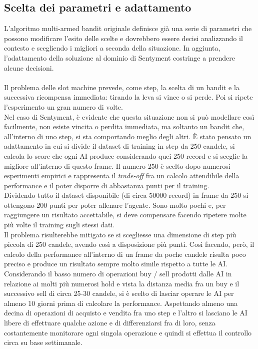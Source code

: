 \documentclass[a4paper,12pt]{report}
\begin{document}
\begin{fig}
\subsection{Scelta dei parametri e adattamento}
L'algoritmo multi-armed bandit originale definisce già una serie di parametri che possono modificare l'esito delle scelte e dovrebbero essere decisi analizzando il contesto e scegliendo i migliori a seconda della situazione. In aggiunta, l'adattamento della soluzione al dominio di Sentyment costringe a prendere alcune decisioni.\\~\\ Il problema delle slot machine prevede, come step, la scelta di un bandit e la successiva ricompensa immediata: tirando la leva si vince o si perde. Poi si ripete l'esperimento un gran numero di volte.\\ Nel caso di Sentyment, è evidente che questa situazione non si può modellare così facilmente, non esiste vincita o perdita immediata, ma soltanto un bandit che, all'interno di uno step, si sta comportando meglio degli altri. È stato pensato un adattamento in cui si divide il dataset di training in step da 250 candele, si calcola lo score che ogni AI produce considerando quei 250 record e si sceglie la migliore all'interno di questo frame. Il numero 250 è scelto dopo numerosi esperimenti empirici e rappresenta il \textit{trade-off} fra un calcolo attendibile della performance e il poter disporre di abbastanza punti per il training. \\ Dividendo tutto il dataset disponibile (di circa 50000 record) in frame da 250 si ottengono 200 punti per poter allenare l'agente. Sono molto pochi e, per raggiungere un risultato accettabile, si deve compensare facendo ripetere molte più volte il training sugli stessi dati.\\ Il problema risulterebbe mitigato se si scegliesse una dimensione di step più piccola di 250 candele, avendo così a disposizione più punti. Così facendo, però, il calcolo della performance all'interno di un frame da poche candele risulta poco preciso e produce un risultato sempre molto simile rispetto a tutte le AI. Considerando il basso numero di operazioni buy / sell prodotti dalle AI in relazione ai molti più numerosi hold e vista la distanza media fra un buy e il successivo sell di circa 25-30 candele, si è scelto di lasciar operare le AI per almeno 10 giorni prima di calcolare la performance. Aspettando almeno una decina di operazioni di acquisto e vendita fra uno step e l'altro si lasciano le AI libere di effettuare qualche azione e di differenziarsi fra di loro, senza costantemente monitorare ogni singola operazione e quindi si effettua il controllo circa su base settimanale.

\end{fig}
\end{document}
